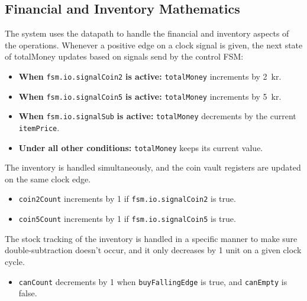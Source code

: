 \subsection{Financial and Inventory Mathematics}
The system uses the datapath to handle the financial and inventory aspects of the operations. Whenever a positive edge on a clock signal is given, the next state of totalMoney updates based on signals send by the control FSM:
\begin{itemize}
    \item \textbf{When} \texttt{fsm.io.signalCoin2} \textbf{is active:} \texttt{totalMoney} increments by 2~kr.
    \item \textbf{When} \texttt{fsm.io.signalCoin5} \textbf{is active:} \texttt{totalMoney} increments by 5~kr.
    \item \textbf{When} \texttt{fsm.io.signalSub} \textbf{is active:} \texttt{totalMoney} decrements by the current \texttt{itemPrice}.
    \item \textbf{Under all other conditions:} \texttt{totalMoney} keeps its current value.
\end{itemize}
The inventory is handled simultaneously, and the coin vault registers are updated on the same clock edge.
\begin{itemize}
    \item \texttt{coin2Count} increments by 1 if \texttt{fsm.io.signalCoin2} is true.
    \item \texttt{coin5Count} increments by 1 if \texttt{fsm.io.signalCoin5} is true.
\end{itemize}
The stock tracking of the inventory is handled in a specific manner to make sure double-subtraction doesn't occur, and it only decreases by 1 unit on a given clock cycle.
\begin{itemize}
    \item \texttt{canCount} decrements by 1 when \texttt{buyFallingEdge} is true, and \texttt{canEmpty} is false.
\end{itemize}

